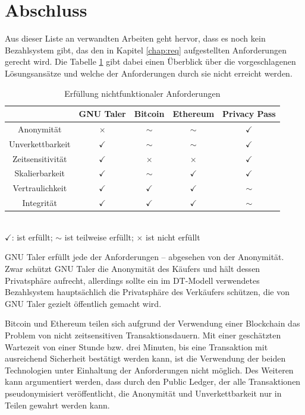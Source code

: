 \documentclass[
	fontsize=11pt,
	headings=small,
	parskip=half,           %
	bibliography=totoc,
	numbers=noenddot,       %
	open=any,               %
]{scrreprt}
\begin{document}
\section{Abschluss}
Aus dieser Liste an verwandten Arbeiten geht hervor, dass es noch kein Bezahlsystem gibt, das den in Kapitel \ref{chap:req} aufgestellten Anforderungen gerecht wird. Die Tabelle \ref{tab:nichtfunktionale_Anforderungen} gibt dabei einen Überblick über die vorgeschlagenen Lösungsansätze und welche der Anforderungen durch sie nicht erreicht werden.
\begin{table}[H]
    \centering
    \begin{tabular}{|c|c|c|c|c|}
        \hline
        & GNU Taler & Bitcoin & Ethereum & Privacy Pass \\
        \hline
        Anonymität & $\times$  & $\mathtt{\sim}$ & $\mathtt{\sim}$ & $\checkmark$ \\
        \hline
        Unverkettbarkeit & $\checkmark$  & $\mathtt{\sim}$ & $\mathtt{\sim}$ & $\checkmark$ \\
        \hline
        Zeitsensitivität & $\checkmark$ & $\times$ & $\times$ & $\checkmark$ \\
        \hline
        Skalierbarkeit & $\checkmark$ & $\mathtt{\sim}$ & $\checkmark$  & $\checkmark$\\
        \hline
        Vertraulichkeit & $\checkmark$ & $\checkmark$ & $\checkmark$ & $\mathtt{\sim}$ \\
        \hline
        Integrität & $\checkmark$ & $\checkmark$ & $\checkmark$ & $\mathtt{\sim}$ \\
        \hline
    \end{tabular}\\
    \vspace{5pt}
    $\checkmark$: ist erfüllt; $\mathtt{\sim}$ ist teilweise erfüllt; $\times$ ist nicht erfüllt
    \caption{Erfüllung nichtfunktionaler Anforderungen}
    \label{tab:nichtfunktionale_Anforderungen}
\end{table}
GNU Taler erfüllt jede der Anforderungen -- abgesehen von der Anonymität. Zwar schützt GNU Taler die Anonymität des Käufers und hält dessen Privatsphäre aufrecht, allerdings sollte ein im DT-Modell verwendetes Bezahlsystem hauptsächlich die Privatsphäre des Verkäufers schützen, die von GNU Taler gezielt öffentlich gemacht wird.

Bitcoin und Ethereum teilen sich aufgrund der Verwendung einer Blockchain das Problem von nicht zeitsensitiven Transaktionsdauern. Mit einer geschätzten Wartezeit von einer Stunde bzw. drei Minuten, bis eine Transaktion mit ausreichend Sicherheit bestätigt werden kann, ist die Verwendung der beiden Technologien unter Einhaltung der Anforderungen nicht möglich. Des Weiteren kann argumentiert werden, dass durch den Public Ledger, der alle Transaktionen pseudonymisiert veröffentlicht, die Anonymität und Unverkettbarkeit nur in Teilen gewahrt werden kann. 
\end{document}
